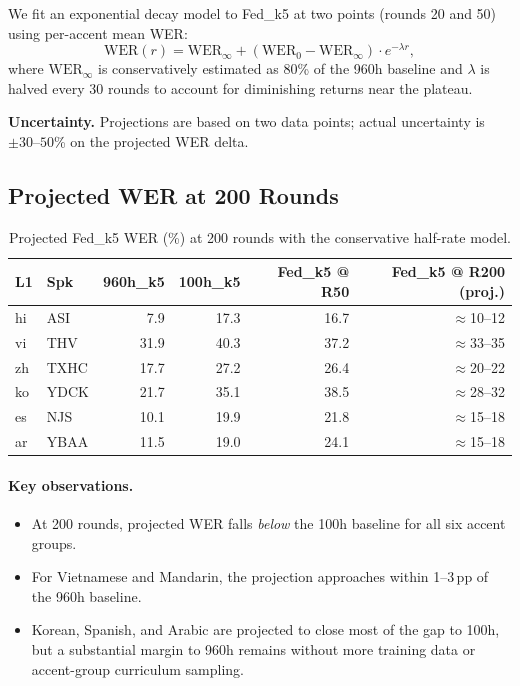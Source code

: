 \documentclass[12pt]{article}
\theoremstyle{plain}
\begin{document}
We fit an exponential decay model to Fed\_k5 at two points
(rounds 20 and 50) using per-accent mean WER:
\begin{equation}
  \mathrm{WER}(r) =
    \mathrm{WER}_\infty
    + (\mathrm{WER}_0 - \mathrm{WER}_\infty) \cdot e^{-\lambda r},
\end{equation}
where $\mathrm{WER}_\infty$ is conservatively estimated as 80\% of the 960h
baseline and $\lambda$ is halved every 30 rounds to account for
diminishing returns near the plateau.

\textbf{Uncertainty.}
Projections are based on two data points;
actual uncertainty is $\pm30$--$50$\% on the projected WER delta.

\subsection{Projected WER at 200 Rounds}

\begin{table}[H]
\centering
\caption{Projected Fed\_k5 WER (\%) at 200 rounds with the conservative
         half-rate model.}
\label{tab:projection}
\begin{tabular}{ll rrrr}
\toprule
\textbf{L1} & \textbf{Spk} &
  \textbf{960h\_k5} & \textbf{100h\_k5} &
  \textbf{Fed\_k5 @ R50} & \textbf{Fed\_k5 @ R200 (proj.)} \\
\midrule
hi & ASI  &  7.9 & 17.3 & 16.7 & $\approx$10--12 \\
vi & THV  & 31.9 & 40.3 & 37.2 & $\approx$33--35 \\
zh & TXHC & 17.7 & 27.2 & 26.4 & $\approx$20--22 \\
ko & YDCK & 21.7 & 35.1 & 38.5 & $\approx$28--32 \\
es & NJS  & 10.1 & 19.9 & 21.8 & $\approx$15--18 \\
ar & YBAA & 11.5 & 19.0 & 24.1 & $\approx$15--18 \\
\bottomrule
\end{tabular}
\end{table}

\paragraph{Key observations.}
\begin{itemize}
  \item At 200 rounds, projected WER falls \emph{below} the 100h baseline for
        all six accent groups.
  \item For Vietnamese and Mandarin, the projection approaches within 1--3\,pp
        of the 960h baseline.
  \item Korean, Spanish, and Arabic are projected to close most of the gap to
        100h, but a substantial margin to 960h remains without more training data
        or accent-group curriculum sampling.
\end{itemize}
\end{document}
